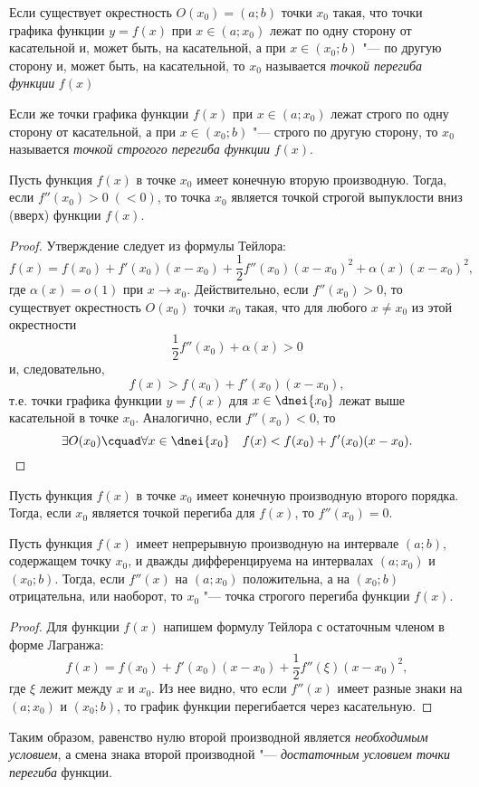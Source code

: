 \begin{defn}
Если существует окрестность $O(x_0)=(a;b)$ точки $x_0$ такая, что точки графика функции $y=f(x)$ при $x\in (a;x_0)$ лежат по одну сторону от касательной и, может быть, на касательной, а при $x\in(x_0;b)$ "--- по другую сторону и, может быть, на касательной, то $x_0$ называется \textit{точкой перегиба функции} $f(x)$

Если же точки графика функции $f(x)$ при $x\in(a;x_0)$ лежат строго по одну сторону от касательной, а при $x\in (x_0;b)$ "--- строго по другую сторону, то $x_0$ называется \textit{точкой строгого перегиба функции} $f(x)$.
\end{defn}

\begin{thm}
Пусть функция $f(x)$ в точке $x_0$ имеет конечную вторую производную. Тогда, если $f''(x_0)>0\; (<0)$, то точка $x_0$ является точкой строгой выпуклости вниз (вверх) функции $f(x)$. 
\end{thm}

\begin{proof}
Утверждение следует из формулы Тейлора:
$$
f(x)=f(x_0)+f'(x_0)(x-x_0)+\frac{1}{2}f''(x_0)(x-x_0)^2+\alpha(x)(x-x_0)^2,
$$
где $\alpha(x)=o(1)$ при $x\to x_0$. Действительно, если $f''(x_0)>0$, то существует окрестность $O(x_0)$ точки $x_0$ такая, что для любого $x\neq x_0$ из этой окрестности
$$
\frac{1}{2}f''(x_0)+\alpha(x)>0
$$
и, следовательно, 
$$
f(x)>f(x_0)+f'(x_0)(x-x_0),
$$
т.е. точки графика функции $y=f(x)$ для $x\in\dnei {x_0}$ лежат выше касательной в точке $x_0$. Аналогично, если $f''(x_0)<0$, то
\begin{equation*}
\exists O(x_0)\cquad \forall x\in \dnei {x_0} \quad f(x)<f(x_0)+f'(x_0)(x-x_0). \qedhere
\end{equation*}
\end{proof}

\begin{cons}
Пусть функция $f(x)$ в точке $x_0$ имеет конечную производную второго порядка. Тогда, если $x_0$ является точкой перегиба для $f(x)$, то $f''(x_0)=0$.
\end{cons}

\begin{thm}
Пусть функция $f(x)$ имеет непрерывную производную на интервале $(a;b)$, содержащем точку $x_0$, и дважды дифференцируема на интервалах $(a;x_0)$ и $(x_0;b)$. Тогда, если $f''(x)$ на $(a;x_0)$ положительна, а на $(x_0;b)$ отрицательна, или наоборот, то $x_0$ "--- точка строгого перегиба функции $f(x)$. 
\end{thm}

\begin{proof}
Для функции $f(x)$ напишем формулу Тейлора с остаточным членом в форме Лагранжа:
$$
f(x)=f(x_0)+f'(x_0)(x-x_0)+\frac{1}{2}f''(\xi)(x-x_0)^2,
$$
где $\xi$ лежит между $x$ и $x_0$. Из нее видно, что если $f''(x)$ имеет разные знаки на $(a;x_0)$ и $(x_0;b)$, то график функции перегибается через касательную.
\end{proof}

Таким образом, равенство нулю второй производной является \textit{необходимым условием}, а смена знака второй производной "--- \textit{достаточным условием точки перегиба} функции.
